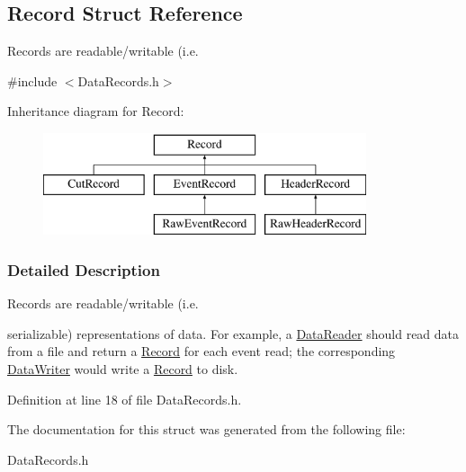 \hypertarget{structRecord}{
\subsection{Record Struct Reference}
\label{structRecord}
}


Records are readable/writable (i.e.  




{\ttfamily \#include $<$DataRecords.h$>$}

Inheritance diagram for Record:\begin{figure}[H]
\begin{center}
\leavevmode
\includegraphics[height=3.000000cm]{structRecord}
\end{center}
\end{figure}


\subsubsection{Detailed Description}
Records are readable/writable (i.e. 

serializable) representations of data. For example, a \hyperlink{classDataReader}{DataReader} should read data from a file and return a \hyperlink{structRecord}{Record} for each event read; the corresponding \hyperlink{classDataWriter}{DataWriter} would write a \hyperlink{structRecord}{Record} to disk. 

Definition at line 18 of file DataRecords.h.



The documentation for this struct was generated from the following file:\begin{DoxyCompactItemize}
\item 
DataRecords.h\end{DoxyCompactItemize}
